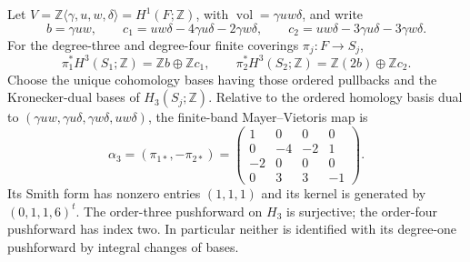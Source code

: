 \begin{proposition}
\label{mapsI:top:finite-degree-three}
Let $V=\mathbb Z\langle\gamma,u,w,\delta\rangle=H^1(F;\mathbb Z)$,
with $\operatorname{vol}=\gamma u w\delta$, and write
\[
 b=\gamma uw,\qquad
 c_1=uw\delta-4\gamma u\delta-2\gamma w\delta,\qquad
 c_2=uw\delta-3\gamma u\delta-3\gamma w\delta.
\]
For the degree-three and degree-four finite coverings $\pi_j:F\to S_j$,
\[
 \pi_1^*H^3(S_1;\mathbb Z)=\mathbb Zb\oplus\mathbb Zc_1,
 \qquad
 \pi_2^*H^3(S_2;\mathbb Z)=\mathbb Z(2b)\oplus\mathbb Zc_2.
\]
Choose the unique cohomology bases having those ordered pullbacks and the
Kronecker-dual bases of $H_3(S_j;\mathbb Z)$. Relative to the ordered
homology basis dual to $(\gamma uw,\gamma u\delta,\gamma w\delta,uw\delta)$,
the finite-band Mayer--Vietoris map is
\[
 \alpha_3=(\pi_{1*},-\pi_{2*})=
 \begin{pmatrix}
 1&0&0&0\\
 0&-4&-2&1\\
 -2&0&0&0\\
 0&3&3&-1
 \end{pmatrix}.
\]
Its Smith form has nonzero entries $(1,1,1)$ and its kernel is generated
by $(0,1,1,6)^t$. The order-three pushforward on $H_3$ is surjective;
the order-four pushforward has index two. In particular neither is
identified with its degree-one pushforward by integral changes of bases.
\end{proposition}

